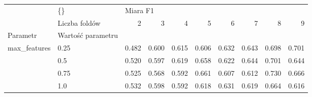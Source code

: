 \begin{tabular}{llrrrrrrrr}
\hline
             & \{\} & \multicolumn{8}{l}{Miara F1} \\
             & Liczba foldów &        2 &      3 &      4 &      5 &      6 &      7 &      8 &      9 \\
Parametr & Wartość parametru &          &        &        &        &        &        &        &        \\
\hline
max\_features & 0.25 &    0.482 &  0.600 &  0.615 &  0.606 &  0.632 &  0.643 &  0.698 &  0.701 \\
             & 0.5 &    0.520 &  0.597 &  0.619 &  0.658 &  0.622 &  0.644 &  0.701 &  0.644 \\
             & 0.75 &    0.525 &  0.568 &  0.592 &  0.661 &  0.607 &  0.612 &  0.730 &  0.666 \\
             & 1.0 &    0.532 &  0.598 &  0.592 &  0.618 &  0.631 &  0.619 &  0.664 &  0.616 \\
\hline
\end{tabular}
